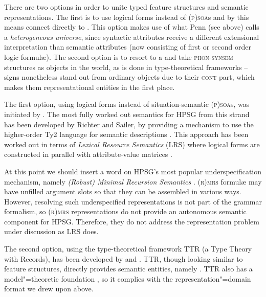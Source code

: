 \documentclass[output=paper]{langsci/langscibook}
\begin{document}
{There are two options in order to unite typed feature structures and semantic representations.
%
The first is to use logical forms  instead of \textsc{(p)soa}s and by this means connect directly to .
%
This option makes use of what Penn (see above) calls a \emph{heterogeneous universe},  since syntactic attributes receive a different extensional interpretation than  semantic attributes (now consisting of first or second order logic formul{\ae}).
%
The second option is to resort to a  and take \textsc{phon-synsem} structures as objects in the world, as is done in type-theoretical frameworks  -- signs nonetheless stand out from ordinary objects due to their \textsc{cont} part, which makes them representational entities in the first place.



The first option, using logical forms instead of situation-semantic \textsc{(p)soa}s, was initiated by \citet{Nerbonne:1992}. 
%
The most fully worked out semantics for HPSG from this strand has been developed by Richter and Sailer, by providing a mechanism to use the higher-order Ty2 language for semantic descriptions \citep{Richter:Sailer:1999:a}.
%
This approach has been worked out in terms of \emph{Lexical Resource Semantics} (LRS)  %
where logical forms are constructed in parallel with attribute-value matrices \citep{Richter:Sailer:04}.


At this point we should insert a word on HPSG's most popular underspecification mechanism, namely \emph{(Robust) Minimal Recursion Semantics}  \citep*{Copestake:Flickinger:Pollard:Sag:2005,Copestake:2007}.
%
\textsc{(r)mrs} formul{\ae} may have unfilled argument slots so that they can be assembled in various ways.
%
However, resolving such underspecified representations is not part of the grammar formalism, so \textsc{(r)mrs} representations do not provide an autonomous semantic component for HPSG.
%
Therefore, they do not address the representation problem under discussion as LRS does. 


The second option, using the type-theoretical framework  TTR (a Type Theory with Records), has been developed by \citet{Cooper:2008,Cooper:2014:a,Cooper:ms} and \citet{Ginzburg:2012}.
%
TTR, though looking similar to feature structures, directly provides semantic entities, namely  \citep[Sec.~5.2.2]{Ginzburg:2012}.
%
TTR also has a model"=theoretic foundation \citep{Cooper:ms}, so it complies with the representation"=domain format we drew upon above.




}
\end{document}
